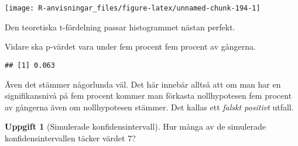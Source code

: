 \documentclass[
]{book}
\newenvironment{Shaded}{\begin{snugshade}}{\end{snugshade}}
\newcommand{\FloatTok}[1]{\textcolor[rgb]{0.00,0.00,0.81}{#1}}
\newcommand{\FunctionTok}[1]{\textcolor[rgb]{0.00,0.00,0.00}{#1}}
\newcommand{\NormalTok}[1]{#1}
\newcommand{\SpecialCharTok}[1]{\textcolor[rgb]{0.00,0.00,0.00}{#1}}
\theoremstyle{definition}
\theoremstyle{definition}
\theoremstyle{definition}
\newtheorem{exercise}{Uppgift}[chapter]
\theoremstyle{definition}
\theoremstyle{remark}
\begin{document}
\begin{center}\texttt{[image: R-anvisningar\_files/figure-latex/unnamed-chunk-194-1]} \end{center}

Den teoretiska t-fördelning passar histogrammet nästan perfekt.

Vidare ska p-värdet vara under fem procent fem procent av gångerna.

\begin{Shaded}
\end{Shaded}

\begin{verbatim}
## [1] 0.063
\end{verbatim}

Även det stämmer någorlunda väl. Det här innebär alltså att om man har en signifikansnivå på fem procent kommer man förkasta nollhypotesen fem procent av gångerna även om nollhypotesen stämmer. Det kallas ett \emph{falskt positivt} utfall.

\begin{exercise}[Simulerade konfidensintervall]
Hur många av de simulerade konfidensintervallen täcker värdet 7?
\end{exercise}
\end{document}
